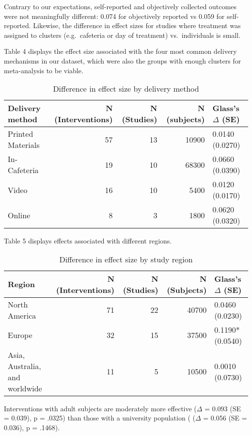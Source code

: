 \documentclass[sn-nature,pdflatex]{sn-jnl}
\begin{document}
Contrary to our expectations, self-reported and objectively collected
outcomes were not meaningfully different: 0.074 for objectively reported
vs 0.059 for self-reported. Likewise, the difference in effect sizes for
studies where treatment was assigned to clusters (e.g.~cafeteria or day
of treatment) vs.~individuals is small.

Table 4 displays the effect size associated with the four most common
delivery mechanisms in our dataset, which were also the groups with
enough clusters for meta-analysis to be viable.

\begin{table}[!h]
\centering
\caption{\label{tab:table_four}Difference in effect size by delivery method}
\centering
\begin{tabular}[t]{lrrrl}
\toprule
Delivery method & N (Interventions) & N (Studies) & N (subjects) & Glass's $\Delta$ (SE)\\
\midrule
Printed Materials & 57 & 13 & 10900 & 0.0140 (0.0270)\\
In-Cafeteria & 19 & 10 & 68300 & 0.0660 (0.0390)\\
Video & 16 & 10 & 5400 & 0.0120 (0.0170)\\
Online & 8 & 3 & 1800 & 0.0620 (0.0320)\\
\bottomrule
\end{tabular}
\end{table}

Table 5 displays effects associated with different regions.

\begin{table}[!h]
\centering
\caption{\label{tab:table_five}Difference in effect size by study region}
\centering
\begin{tabular}[t]{lrrrl}
\toprule
Region & N (Interventions) & N (Studies) & N (Subjects) & Glass's $\Delta$ (SE)\\
\midrule
North America & 71 & 22 & 40700 & 0.0460 (0.0230)\\
Europe & 32 & 15 & 37500 & 0.1190* (0.0540)\\
Asia, Australia, and worldwide & 11 & 5 & 10500 & 0.0010 (0.0730)\\
\bottomrule
\end{tabular}
\end{table}

Interventions with adult subjects are moderately more effective
(\(\Delta\) = 0.093 (SE = 0.039), p = .0325) than those with a
university population ( (\(\Delta\) = 0.056 (SE = 0.036), p = .1468).
\end{document}
